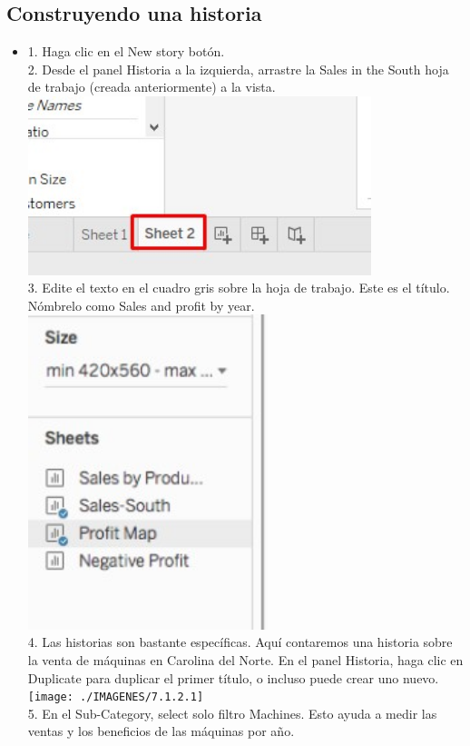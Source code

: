 \documentclass[preprint,12pt]{elsarticle}
\begin{document}
	\subsection{Construyendo una historia}
			\begin{itemize}
				\item 
				1. Haga clic en el New story botón.
				\\ 2. Desde el panel Historia a la izquierda, arrastre la Sales in the South hoja de trabajo
				(creada anteriormente) a la vista.
					\\	\includegraphics[width=10cm]{./IMAGENES/7.1.1}
				\\ 3. Edite el texto en el cuadro gris sobre la hoja de trabajo. Este es el título. Nómbrelo como Sales
				and profit by year.
					\\	\includegraphics[width=7cm]{./IMAGENES/7.1.2}
				\\ 4. Las historias son bastante específicas. Aquí contaremos una historia sobre la venta de máquinas
				en Carolina del Norte. En el panel Historia, haga clic en Duplicate para duplicar el primer
				título, o incluso puede crear uno nuevo.
					\\	\texttt{[image: ./IMAGENES/7.1.2.1]}
				\\ 5. En el Sub-Category, select solo filtro Machines. Esto ayuda a medir las ventas y los
				beneficios de las máquinas por año.
				

\end{itemize}
\end{document}
